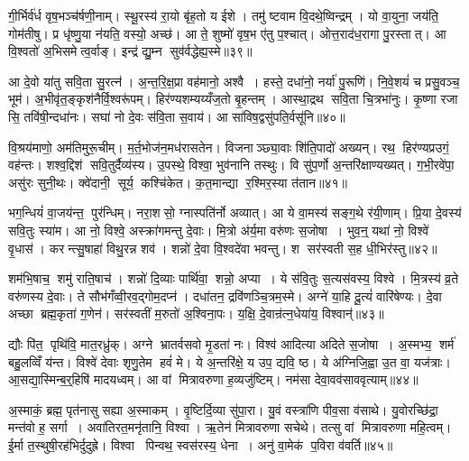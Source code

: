 गी॒र्भिर्व॑र्ध वृष॒भञ्च॑र्\mbox{}षणी॒नाम्। स्थू॒रस्य॑ रा॒यो बृ॑ह॒तो य ईशे। तमु॑ ष्टवाम वि॒दथे॒ष्विन्द्रम्। यो वा॒युना॒ जय॑ति॒ गोम॑तीषु। प्र धृ॑ष्णु॒या न॑यति॒ वस्यो॒ अच्छ॑। आ ते॒ शुष्मो॑ वृष॒भ ए॑तु प॒श्चात्। ओत्त॒राद॑ध॒रागा पु॒रस्तात्। आ वि॒श्वतो॑ अ॒भिसमेत्व॒र्वाङ्। इन्द्र॑ द्यु॒म्न सुव॑र्वद्धेह्य॒स्मे॥३९॥\anuvakamend[व॒राहैर्वि॒श्वहा॑ऽजनिष्ट पू॒षोद्वरी॑वृजत्खा॒दयो॑ वः पा॒न्त्यस्त्या॒भिर्नव॑ च]

आ दे॒वो या॑तु सवि॒ता सु॒रत्न॑। अ॒न्त॒रि॒क्ष॒प्रा वह॑मानो॒ अश्वै। हस्ते॒ दधा॑नो॒ नर्या॑ पु॒रूणि॑। नि॒वे॒शयं॑ च प्रसु॒वञ्च॒ भूम॑। अ॒भीवृ॑त॒ङ्कृश॑नैर्वि॒श्वरू॑पम्। हिर॑ण्यशम्यय्यँज॒तो बृ॒हन्तम्। आस्था॒द्रथ सवि॒ता चि॒त्रभा॑नुः। कृ॒ष्णा रजा सि॒ तवि॑षी॒न्दधा॑नः। सघा॑ नो दे॒वः स॑वि॒ता स॒वाय॑। आ सा॑विष॒द्वसु॑पति॒र्वसू॑नि॥४०॥

वि॒श्रय॑माणो॒ अम॑तिमुरू॒चीम्। म॒र्त॒भोज॑न॒मध॑रासतेन। विजनाञ्छ्या॒वाः शि॑ति॒पादो॑ अख्यन्। रथ॒ हिर॑ण्यप्रउगं॒ वह॑न्तः। शश्व॒द्दिश॑ सवि॒तुर्दैव्य॑स्य। उ॒पस्थे॒ विश्वा॒ भुव॑नानि तस्थुः। वि सु॑प॒र्णो अ॒न्तरि॑क्षाण्यख्यत्। ग॒भी॒रवे॑पा॒ असु॑रः सुनी॒थः। क्वे॑दानी॒ सूर्य॒ कश्चि॑केत। क॒त॒मान्द्या र॒श्मिर॒स्या त॑तान॥४१॥

भग॒न्धियं॑ वा॒जय॑न्त॒ पुर॑न्धिम्। नरा॒शसो॒ ग्नास्पति॑र्नो अव्यात्। आ ये वा॒मस्य॑ सङ्ग॒थे र॑यी॒णाम्। प्रि॒या दे॒वस्य॑ सवि॒तुः स्या॑म। आ नो॒ विश्वे॒ अस्क्रा॑गमन्तु दे॒वाः। मि॒त्रो अ॑र्य॒मा वरु॑णः स॒जोषा। भुव॒न्॒ यथा॑ नो॒ विश्वे॑ वृ॒धास॑। करन्त्सु॒षाहा॑ विथु॒रन्न शव॑। शन्नो॑ दे॒वा वि॒श्वदे॑वा भवन्तु। श सर॑स्वती स॒ह धी॒भिर॑स्तु॥४२॥

शम॑भि॒षाच॒ शमु॑ राति॒षाच॑। शन्नो॑ दि॒व्याः पार्थि॑वा॒ शन्नो॒ अप्या। ये स॑वि॒तुः स॒त्यस॑वस्य॒ विश्वे। मि॒त्रस्य॑ व्र॒ते वरु॑णस्य दे॒वाः। ते सौभ॑गँव्वी॒रव॒द्गोम॒दप्न॑। दधा॑तन॒ द्रवि॑णञ्चि॒त्रम॒स्मे। अग्ने॑ या॒हि दू॒त्यं॑ वारि॑षेण्यः। दे॒वा अच्छा ब्रह्म॒कृता॑ ग॒णेन॑। सर॑स्वतीं म॒रुतो॑ अ॒श्विना॒पः। य॒क्षि॒ दे॒वान्र॑त्न॒धेया॑य॒ विश्वान्॑॥४३॥

द्यौः पि॑त॒ पृथि॑वि॒ मात॒रध्रु॑क्। अग्ने भ्रातर्वसवो मृ॒डता॑ नः। विश्व॑ आदित्या अदिते स॒जोषा। अ॒स्मभ्य॒ शर्म॑ बहु॒लव्विँ य॑न्त। विश्वे॑ देवाः शृणु॒तेम हवं॑ मे। ये अ॒न्तरि॑क्षे॒ य उप॒ द्यवि॒ ष्ठ। ये अ॑ग्निजि॒ह्वा उ॒त वा॒ यज॑त्राः। आ॒सद्या॒स्मिन्ब॒र्॒हिषि॑ मादयध्वम्। आ वां मित्रावरुणा ह॒व्यजु॑ष्टिम्। नम॑सा देवा॒वव॑साववृत्याम्॥४४॥

अ॒स्माकं॒ ब्रह्म॒ पृत॑नासु सह्या अ॒स्माकम्। वृ॒ष्टिर्दि॒व्या सु॑पा॒रा। यु॒वं वस्त्रा॑णि पीव॒सा व॑साथे। यु॒वोरच्छि॑द्रा॒ मन्त॑वो ह॒ सर्गा। अवा॑तिरत॒मनृ॑तानि॒ विश्वा। ऋ॒तेन॑ मित्रावरुणा सचेथे। तत्सु वां मित्रावरुणा महि॒त्वम्। ई॒र्मा त॒स्थुषी॒रह॑भिर्दुदुह्रे। विश्वा पिन्वथ॒ स्वस॑रस्य॒ धेना। अनु॑ वा॒मेक॑ प॒विरा व॑वर्ति॥४५॥

